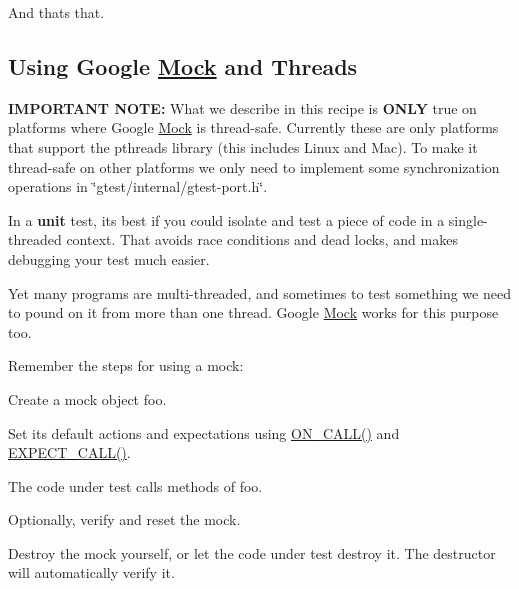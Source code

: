 And that\textquotesingle{}s that.

\subsection*{Using Google \mbox{\hyperlink{class_mock}{Mock}} and Threads}

{\bfseries{I\+M\+P\+O\+R\+T\+A\+NT N\+O\+TE\+:}} What we describe in this recipe is {\bfseries{O\+N\+LY}} true on platforms where Google \mbox{\hyperlink{class_mock}{Mock}} is thread-\/safe. Currently these are only platforms that support the pthreads library (this includes Linux and Mac). To make it thread-\/safe on other platforms we only need to implement some synchronization operations in {\ttfamily \char`\"{}gtest/internal/gtest-\/port.\+h\char`\"{}}.

In a {\bfseries{unit}} test, it\textquotesingle{}s best if you could isolate and test a piece of code in a single-\/threaded context. That avoids race conditions and dead locks, and makes debugging your test much easier.

Yet many programs are multi-\/threaded, and sometimes to test something we need to pound on it from more than one thread. Google \mbox{\hyperlink{class_mock}{Mock}} works for this purpose too.

Remember the steps for using a mock\+:


\begin{DoxyEnumerate}
\item Create a mock object {\ttfamily foo}.
\end{DoxyEnumerate}
\begin{DoxyEnumerate}
\item Set its default actions and expectations using {\ttfamily \mbox{\hyperlink{googletest-master_2googlemock_2include_2gmock_2gmock-spec-builders_8h_a5b12ae6cf84f0a544ca811b380c37334}{O\+N\+\_\+\+C\+A\+L\+L()}}} and {\ttfamily \mbox{\hyperlink{googletest-master_2googlemock_2include_2gmock_2gmock-spec-builders_8h_a535a6156de72c1a2e25a127e38ee5232}{E\+X\+P\+E\+C\+T\+\_\+\+C\+A\+L\+L()}}}.
\end{DoxyEnumerate}
\begin{DoxyEnumerate}
\item The code under test calls methods of {\ttfamily foo}.
\end{DoxyEnumerate}
\begin{DoxyEnumerate}
\item Optionally, verify and reset the mock.
\end{DoxyEnumerate}
\begin{DoxyEnumerate}
\item Destroy the mock yourself, or let the code under test destroy it. The destructor will automatically verify it.
\end{DoxyEnumerate}

